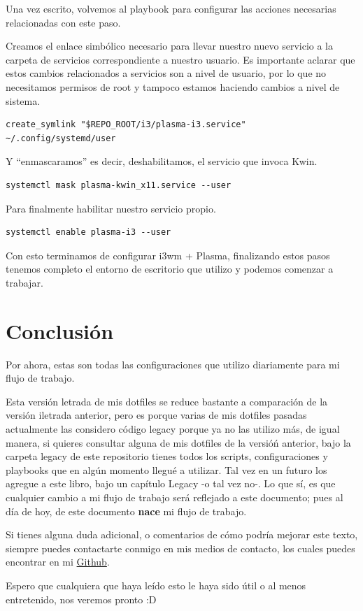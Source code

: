 \documentclass[11pt]{article}
\begin{document}
Una vez escrito, volvemos al playbook para configurar las acciones necesarias relacionadas con este paso.

Creamos el enlace simbólico necesario para llevar nuestro nuevo servicio a la carpeta de servicios correspondiente a nuestro usuario. Es importante aclarar que estos cambios relacionados a servicios son a nivel de usuario, por lo que no necesitamos permisos de root y tampoco estamos haciendo cambios a nivel de sistema.

\begin{verbatim}
create_symlink "$REPO_ROOT/i3/plasma-i3.service" ~/.config/systemd/user
\end{verbatim}

Y ``enmascaramos'' es decir, deshabilitamos, el servicio que invoca Kwin.

\begin{verbatim}
systemctl mask plasma-kwin_x11.service --user
\end{verbatim}

Para finalmente habilitar nuestro servicio propio.

\begin{verbatim}
systemctl enable plasma-i3 --user
\end{verbatim}

Con esto terminamos de configurar i3wm + Plasma, finalizando estos pasos tenemos completo el entorno de escritorio que utilizo y podemos comenzar a trabajar.
\section{Conclusión}
\label{sec:org6aed420}

Por ahora, estas son todas las configuraciones que utilizo diariamente para mi flujo de trabajo.

Esta versión letrada de mis dotfiles se reduce bastante a comparación de la versión iletrada anterior, pero es porque varias de mis dotfiles pasadas actualmente las considero código legacy porque ya no las utilizo más, de igual manera, si quieres consultar alguna de mis dotfiles de la versióń anterior, bajo la carpeta legacy de este repositorio tienes todos los scripts, configuraciones y playbooks que en algún momento llegué a utilizar. Tal vez en un futuro los agregue a este libro, bajo un capítulo Legacy -o tal vez no-. Lo que sí, es que cualquier cambio a mi flujo de trabajo será reflejado a este documento; pues al día de hoy, de este documento \textbf{nace} mi flujo de trabajo.

Si tienes alguna duda adicional, o comentarios de cómo podría mejorar este texto, siempre puedes contactarte conmigo en mis medios de contacto, los cuales puedes encontrar en mi \href{https://github.com/IsaacNietoG}{Github}.

Espero que cualquiera que haya leído esto le haya sido útil o al menos entretenido, nos veremos pronto :D
\end{document}
